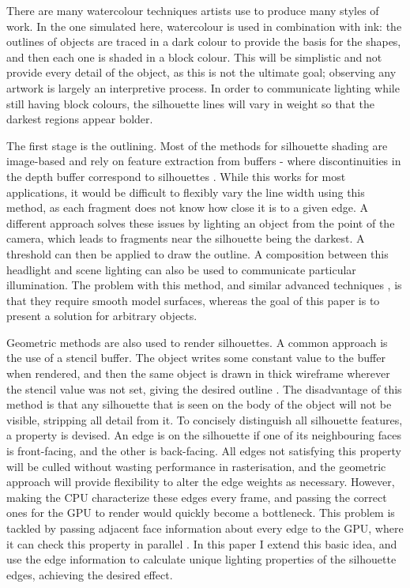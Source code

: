 \documentclass[a4paper, 12pt]{article}
\begin{document}
There are many watercolour techniques artists use to produce many styles of work. In the one simulated here, watercolour is used in combination with ink: the outlines of objects are traced in a dark colour to provide the basis for the shapes, and then each one is shaded in a block colour. This will be simplistic and not provide every detail of the object, as this is not the ultimate goal; observing any artwork is largely an interpretive process. In order to communicate lighting while still having block colours, the silhouette lines will vary in weight so that the darkest regions appear bolder.

The first stage is the outlining. Most of the methods for silhouette shading are image-based and rely on feature extraction from buffers - where discontinuities in the depth buffer correspond to silhouettes \cite{Saito1990}. While this works for most applications, it would be difficult to flexibly vary the line width using this method, as each fragment does not know how close it is to a given edge. A different approach solves these issues by lighting an object from the point of the camera, which leads to fragments near the silhouette being the darkest. A threshold can then be applied to draw the outline. A composition between this headlight and scene lighting can also be used to communicate particular illumination. The problem with this method, and similar advanced techniques \cite{Goodwin2007}, is that they require smooth model surfaces, whereas the goal of this paper is to present a solution for arbitrary objects.

Geometric methods are also used to render silhouettes. A common approach is the use of a stencil buffer. The object writes some constant value to the buffer when rendered, and then the same object is drawn in thick wireframe wherever the stencil value was not set, giving the desired outline \cite{McGuire2004}. The disadvantage of this method is that any silhouette that is seen on the body of the object will not be visible, stripping all detail from it. To concisely distinguish all silhouette features, a property is devised. An edge is on the silhouette if one of its neighbouring faces is front-facing, and the other is back-facing. All edges not satisfying this property will be culled without wasting performance in rasterisation, and the geometric approach will provide flexibility to alter the edge weights as necessary. However, making the CPU characterize these edges every frame, and passing the correct ones for the GPU to render would quickly become a bottleneck. This problem is tackled by passing adjacent face information about every edge to the GPU, where it can check this property in parallel \cite{Hughes2004}. In this paper I extend this basic idea, and use the edge information to calculate unique lighting properties of the silhouette edges, achieving the desired effect.
\end{document}
